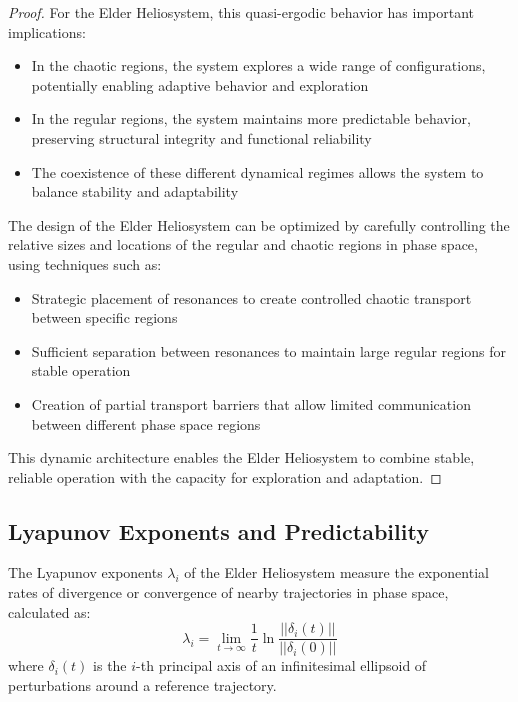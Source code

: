 \begin{proof}
For the Elder Heliosystem, this quasi-ergodic behavior has important implications:
\begin{itemize}
    \item In the chaotic regions, the system explores a wide range of configurations, potentially enabling adaptive behavior and exploration
    \item In the regular regions, the system maintains more predictable behavior, preserving structural integrity and functional reliability
    \item The coexistence of these different dynamical regimes allows the system to balance stability and adaptability
\end{itemize}

The design of the Elder Heliosystem can be optimized by carefully controlling the relative sizes and locations of the regular and chaotic regions in phase space, using techniques such as:
\begin{itemize}
    \item Strategic placement of resonances to create controlled chaotic transport between specific regions
    \item Sufficient separation between resonances to maintain large regular regions for stable operation
    \item Creation of partial transport barriers that allow limited communication between different phase space regions
\end{itemize}

This dynamic architecture enables the Elder Heliosystem to combine stable, reliable operation with the capacity for exploration and adaptation.
\end{proof}

\subsection{Lyapunov Exponents and Predictability}

\begin{definition}
The Lyapunov exponents $\lambda_i$ of the Elder Heliosystem measure the exponential rates of divergence or convergence of nearby trajectories in phase space, calculated as:
\begin{equation}
\lambda_i = \lim_{t \to \infty} \frac{1}{t} \ln \frac{||\delta_i(t)||}{||\delta_i(0)||}
\end{equation}
where $\delta_i(t)$ is the $i$-th principal axis of an infinitesimal ellipsoid of perturbations around a reference trajectory.
\end{definition}

